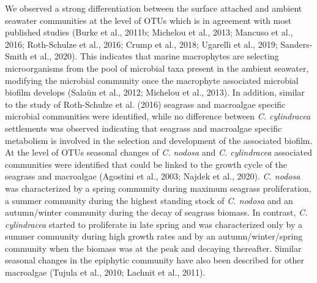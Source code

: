 \documentclass[
  12pt,
]{article}
\begin{document}
We observed a strong differentiation between the surface attached and
ambient seawater communities at the level of OTUs which is in agreement
with most published studies (Burke et al., 2011b; Michelou et al., 2013;
Mancuso et al., 2016; Roth-Schulze et al., 2016; Crump et al., 2018;
Ugarelli et al., 2019; Sanders-Smith et al., 2020). This indicates that
marine macrophytes are selecting microorganisms from the pool of
microbial taxa present in the ambient seawater, modifying the microbial
community once the macrophyte associated microbial biofilm develops
(Salaün et al., 2012; Michelou et al., 2013). In addition, similar to
the study of Roth-Schulze et al. (2016) seagrass and macroalgae specific
microbial communities were identified, while no difference between
\emph{C. cylindracea} settlements was observed indicating that seagrass
and macroalgae specific metabolism is involved in the selection and
development of the associated biofilm. At the level of OTUs seasonal
changes of \emph{C. nodosa} and \emph{C. cylindracea} associated
communities were identified that could be linked to the growth cycle of
the seagrass and macroalgae (Agostini et al., 2003; Najdek et al.,
2020). \emph{C. nodosa} was characterized by a spring community during
maximum seagrass proliferation, a summer community during the highest
standing stock of \emph{C. nodosa} and an autumn/winter community during
the decay of seagrass biomass. In contrast, \emph{C. cylindracea}
started to proliferate in late spring and was characterized only by a
summer community during high growth rates and by an autumn/winter/spring
community when the biomass was at the peak and decaying thereafter.
Similar seasonal changes in the epiphytic community have also been
described for other macroalgae (Tujula et al., 2010; Lachnit et al.,
2011).
\end{document}
